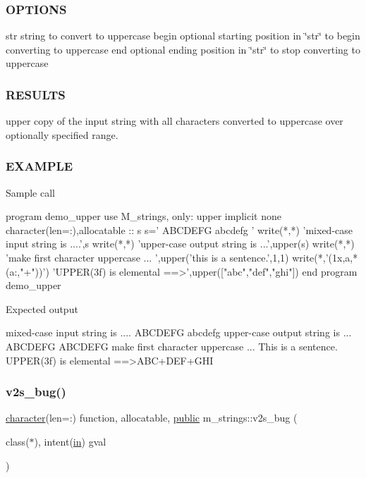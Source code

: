 \subsubsection*{O\+P\+T\+I\+O\+NS}

str string to convert to uppercase begin optional starting position in \char`\"{}str\char`\"{} to begin converting to uppercase end optional ending position in \char`\"{}str\char`\"{} to stop converting to uppercase

\subsubsection*{R\+E\+S\+U\+L\+TS}

upper copy of the input string with all characters converted to uppercase over optionally specified range.

\subsubsection*{E\+X\+A\+M\+P\+LE}

\begin{DoxyVerb}Sample call

 program demo_upper
 use M_strings, only: upper
 implicit none
 character(len=:),allocatable  :: s
    s=' ABCDEFG abcdefg '
    write(*,*) 'mixed-case input string is ....',s
    write(*,*) 'upper-case output string is ...',upper(s)
    write(*,*) 'make first character uppercase  ... ',upper('this is a sentence.',1,1)
    write(*,'(1x,a,*(a:,"+"))') 'UPPER(3f) is elemental ==>',upper(["abc","def","ghi"])
 end program demo_upper

Expected output

 mixed-case input string is .... ABCDEFG abcdefg
 upper-case output string is ... ABCDEFG ABCDEFG
 make first character uppercase  ... This is a sentence.
 UPPER(3f) is elemental ==>ABC+DEF+GHI \end{DoxyVerb}
 \mbox{\label{namespacem__strings_a76a00e3ca7fb7c9b9cadcd484c6e3946}} 
\subsubsection{\texorpdfstring{v2s\+\_\+bug()}{v2s\_bug()}}
{\footnotesize\ttfamily \hyperlink{option__stopwatch_83_8txt_abd4b21fbbd175834027b5224bfe97e66}{character}(len=\+:) function, allocatable, \hyperlink{M__stopwatch_83_8txt_a2f74811300c361e53b430611a7d1769f}{public} m\+\_\+strings\+::v2s\+\_\+bug (\begin{DoxyParamCaption}\item[{class($\ast$), intent(\hyperlink{M__journal_83_8txt_afce72651d1eed785a2132bee863b2f38}{in})}]{gval }\end{DoxyParamCaption})}



